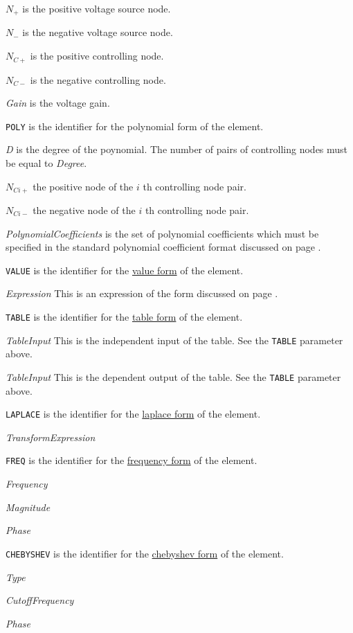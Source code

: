 \begin{widelist}
\item[$N_{+}$] is the positive voltage source node.
\item[$N_{-}$] is the negative voltage source node.
\item[$N_{C+}$] is the positive controlling node.
\item[$N_{C-}$] is the negative controlling  node.
\item[{\it Gain}] is the voltage gain.
\item[{\tt POLY}] is the identifier for the polynomial form of the
element.
\item[{\it D}] is the degree of the poynomial. The number of pairs of
           controlling nodes must be equal to {\it Degree}.
\item[$N_{Ci+}$] the positive node of the $i$ th controlling node pair.
\item[$N_{Ci-}$] the negative node of the $i$ th controlling node pair.
\item[{\it PolynomialCoefficients}] is the set of polynomial coefficients
which must be specified in the standard polynomial coefficient format
discussed on page \pageref{section:poly}.
\item[{\tt VALUE}]
is the identifier for the \underline{value form} of the element.
\item[{\it Expression}] This is an expression of the form discussed on
page \pageref{section:poly}.
\item[{\tt TABLE}]
is the identifier for the \underline{table form} of the element.
\item[{\it TableInput}] This is the independent input of the table.
See the {\tt TABLE} parameter above.
\item[{\it TableInput}] This is the dependent output of the table.
See the {\tt TABLE} parameter above.
\item[{\tt LAPLACE}]
is the identifier for the \underline{laplace form} of the element.
\item[{\it TransformExpression}]
\item[{\tt FREQ}]
is the identifier for the \underline{frequency form} of the element.
\item[{\it Frequency}]
\item[{\it Magnitude}]
\item[{\it Phase}]
\item[{\tt CHEBYSHEV}]
is the identifier for the \underline{chebyshev form} of the element.
\item[{\it Type}]
\item[{\it CutoffFrequency}]
\item[{\it Phase}]
\end{widelist}
